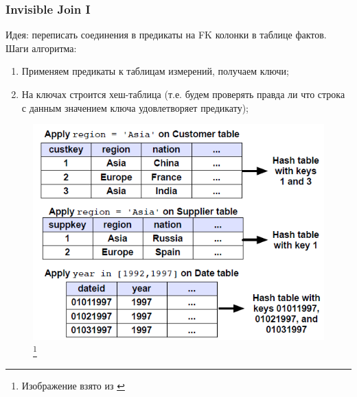 \documentclass{beamer}
\begin{document}
\begin{frame}
\frametitle{Invisible Join I}

Идея: переписать соединения в предикаты на FK колонки в таблице фактов. Шаги алгоритма:
\begin{enumerate}
  \item Применяем предикаты к таблицам измерений, получаем ключи;
  \item На ключах строится хеш-таблица (т.е. будем проверять правда ли что строка с данным значением ключа удовлетворяет предикату);
\end{enumerate}

\begin{figure}[htb]
\includegraphics[width=\textwidth,height=0.50\textheight,keepaspectratio]{i1.png} 
\footnote{\tiny{Изображение взято из \cite{Abadi2008}}}
\end{figure}   

\end{frame}
\end{document}
